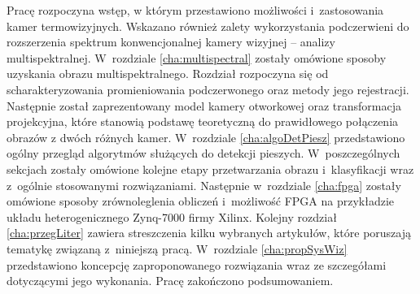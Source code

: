 Pracę rozpoczyna wstęp, w którym przestawiono możliwości i~zastosowania kamer termowizyjnych. 
Wskazano również zalety wykorzystania podczerwieni do rozszerzenia spektrum konwencjonalnej kamery wizyjnej -- analizy multispektralnej.
W~rozdziale \ref{cha:multispectral} zostały omówione sposoby uzyskania obrazu multispektralnego. 
Rozdział rozpoczyna się od scharakteryzowania promieniowania podczerwonego oraz metody jego rejestracji. 
Następnie został zaprezentowany model kamery otworkowej oraz transformacja projekcyjna, które stanowią podstawę teoretyczną do prawidłowego połączenia obrazów z dwóch różnych kamer.
W~rozdziale \ref{cha:algoDetPiesz} przedstawiono ogólny przegląd algorytmów służących do detekcji pieszych. 
W~poszczególnych sekcjach zostały omówione kolejne etapy przetwarzania obrazu i~klasyfikacji wraz z~ogólnie stosowanymi rozwiązaniami.%
Następnie w~rozdziale \ref{cha:fpga} zostały omówione sposoby zrównoleglenia obliczeń i~możliwość FPGA na przykładzie układu heterogenicznego Zynq-7000 firmy Xilinx.
Kolejny rozdział \ref{cha:przegLiter} zawiera streszczenia kilku wybranych artykułów, które poruszają tematykę związaną z~niniejszą pracą.
W~rozdziale \ref{cha:propSysWiz} przedstawiono koncepcję zaproponowanego rozwiązania wraz ze szczegółami dotyczącymi jego wykonania.
Pracę zakończono podsumowaniem.

